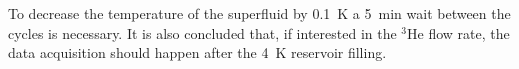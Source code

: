 To decrease the temperature of the superfluid by 0.1~K a 5~min wait
between the cycles is necessary. It is also concluded that, if
interested in the $^3$He flow rate, the data acquisition should happen
after the 4~K reservoir filling.









  
  
  
